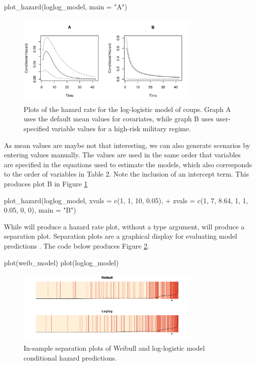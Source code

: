 \begin{example}
  plot_hazard(loglog_model, main = "A")
\end{example}

\begin{figure}
\begin{center}
\includegraphics[width=0.8\textwidth]{graphics/hazard-ex.pdf}
\caption{Plots of the hazard rate for the log-logistic model of coups. Graph A uses the default mean values for covariates, while graph B uses user-specified variable values for a high-risk military regime.}
\label{hazard-ex}
\end{center}
\end{figure}

As mean values are maybe not that interesting, we can also generate
scenarios by entering values manually. The values are used in the same
order that variables are specified in the equations used to estimate the
models, which also corresponds to the order of variables in Table 2.
Note the inclusion of an intercept term. This produces plot B in Figure
\ref{hazard-ex}

\begin{example}
  plot_hazard(loglog_model, xvals = c(1, 1, 10, 0.05), 
  +    zvals = c(1, 7, 8.64, 1, 1, 0.05, 0, 0), main = "B")
\end{example}

While  will produce a hazard rate plot, without a type argument,
 will produce a separation plot. Separation plots are a graphical
display for evaluating model predictions \citep{greenhill2011separation}. The code below produces Figure \ref{insamp}.

\begin{example}
  plot(weib_model)
  plot(loglog_model)
\end{example}

\begin{figure}
\begin{center}
\includegraphics[width=0.8\textwidth]{graphics/sepplots.pdf}
\caption{In-sample separation plots of Weibull and log-logistic model conditional hazard predictions.}
\label{insamp}
\end{center}
\end{figure}

